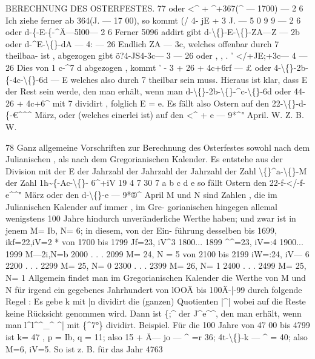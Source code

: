 \documentclass[12pt,a4paper]{article}
\begin{document}
BERECHNUNG  DES  OSTERFESTES.  77
oder
<\^{}  +  \^{}+367(\^{}  --- 1700)  --- 2  6
Ich  ziehe  ferner  ab    364(J.  --- 17  00),    so  kommt
(/ 4- jE  +  3  J.  ---  5  0  9  9  ---  2  6
oder
d-\{-E-\{-\^{}Ä---5l00---  2  6
Ferner  5096  addirt  gibt
d-\textbackslash\{\}-E-\textbackslash\{\}-ZA---Z  ---  2b
oder
d-\^{}E-\textbackslash\{\}-dA  ---  4:  ---  26
Endlich    ZA  ---  3c,  welches  offenbar  durch  7   theilbaa-  ist ,  abgezogen  gibt
ö?4-JS4-3c--- 3  --- 26
oder  ,     ,  .     '
</+JE;+3c--- 4  --- 26
Dies  von    1  c-\^{}7  d   abgezogen ,  kommt  '        -
3  +  26  +  4c+6rf  --- £
oder
4-\textbackslash\{\}-2b-\{-4c-\textbackslash\{\}-6d  ---  E
welches  also  durch  7   theilbar  sein  muss.     Hieraus  ist  klar,  dass  E  der  Rest
sein  werde,  den  man  erhält,  wenn  man
d-\textbackslash\{\}-2b-\textbackslash\{\}-\^{}c-\textbackslash\{\}-6d
oder
44-26  +  4c+6\^{}
mit  7   dividirt ,  folglich    E  =  e.
Es  fällt  also  Ostern  auf  den  22-\textbackslash\{\}-d-\{-€\^{}\^{}\^{}  März,   oder  (welches  einerlei  ist)
auf  den    <\^{}  +  e  --- 9*\^{}"  April.     W.  Z.  B.  W.

\newpage

78
Ganz  allgemeine  Vorschriften  zur  Berechnung  des  Osterfestes
sowohl  nach  dem  Julianischen ,  als  nach  dem  Gregorianischen  Kalender.
Es  entstehe  aus  der  Division
mit
der  E
der  Jahrzahl
der  Jahrzahl
der  Jahrzahl
der  Zahl   \textbackslash\{\}\^{}a-\textbackslash\{\}-M
der  Zahl     1h\textasciitilde{}\{-Ac-\textbackslash\{\}- 6\^{}+iV
19
4
7
30
7
a
b
c
d
e
so  fällt  Ostern  den  22-f-</-f-e\^{}\^{}"  März
oder  den     d-\textbackslash\{\}-e  ---  9*®\^{}  April
M  und  N  sind  Zahlen ,  die  im  Julianischen  Kalender  auf  immer ,  im  Gre-
gorianischen hingegen  allemal  wenigstens  100  Jahre  hindurch  unveränderliche
Werthe  haben;  und  zwar  ist  in  jenem  M=  Ib,  N=  6;  in  diesem,  von  der  Ein-
führung desselben  bis  1699,  ikf=22,iV=2  *
von  1700  bis  1799  Jf=23,  iV\^{}3
1800...  1899  \^{}\^{}=23,   iV=:4
1900...  1999  M---2i,N=b
2000  .  .  .  2099  M=  24,  N  =  5
von  2100  bis  2199  iW=:24,   iV--- 6
2200  .  .  .  2299  M=  25,   N=  0
2300  .  .  .  2399  M=  26,  N=  1
2400  .  .  .  2499  M=  25,   N=  1
Allgemein  findet  man  im  Gregorianischen  Kalender  die  Werthe  von  M
und  N  für  irgend  ein  gegebenes  Jahrhundert  von  lOOÄ  bis  100Ä-|-99  durch
folgende  Regel  :
Es  gebe
k  mit  |n  dividirt  die  (ganzen)  Quotienten  |\^{}|
wobei  auf  die  Reste  keine  Rücksicht  genommen  wird.
Dann  ist
\{;\^{}  der  J\^{}e\^{}\^{},  den  man  erhält,  wenn  man  l\^{}l\^{}\^{}\_\^{}    \^{}|  mit  \{\^{}7°\}  dividirt.
Beispiel.  Für  die  100  Jahre  von  47  00  bis  4799  ist  k=  47 ,  p  =  Ib,  q  =  11;
also  15  +  Ä--- jo  --- \^{}  =r  36;  4t-\textbackslash\{\}-k --- \^{}  =  40;  also  M=6,  iV=5.  So  ist  z.  B.
für  das  Jahr  4763
\end{document}

